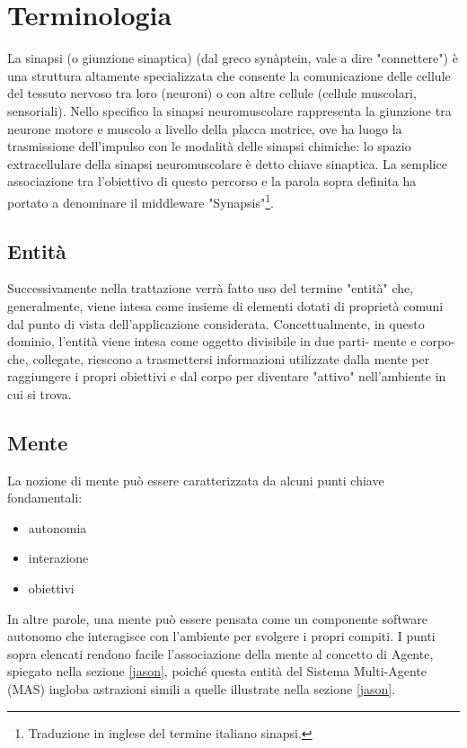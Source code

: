 \section{Terminologia}

La sinapsi (o giunzione sinaptica) (dal greco synàptein, vale a dire "connettere") è una struttura altamente specializzata che consente la comunicazione delle cellule del tessuto nervoso tra loro (neuroni) o con altre cellule (cellule muscolari, sensoriali). Nello specifico la sinapsi neuromuscolare rappresenta la giunzione tra neurone motore e muscolo a livello della placca motrice, ove ha luogo la trasmissione dell'impulso con le modalità delle sinapsi chimiche: lo spazio extracellulare della sinapsi neuromuscolare è detto chiave sinaptica.\cite{treccani}
La semplice associazione tra l'obiettivo di questo percorso e la parola sopra definita ha portato a denominare il middleware "Synapsis"\footnote{Traduzione in inglese del termine italiano sinapsi.}.

\subsection{Entità}

Successivamente nella trattazione verrà fatto uso del termine "entità" che, generalmente, viene intesa come insieme di elementi dotati di proprietà comuni dal punto di vista dell’applicazione considerata.\cite{treccani}
Concettualmente, in questo dominio, l'entità viene intesa come oggetto divisibile in due parti- mente e corpo- che, collegate, riescono a trasmettersi informazioni utilizzate dalla mente per raggiungere i propri obiettivi e dal corpo per diventare "attivo" nell'ambiente in cui si trova.

\subsection{Mente}

La nozione di mente può essere caratterizzata da alcuni punti chiave fondamentali:
\begin{itemize}
   \item autonomia
   \item interazione
   \item obiettivi
\end{itemize}
In altre parole, una mente può essere pensata come un componente software autonomo che interagisce con l'ambiente per svolgere i propri compiti.
I punti sopra elencati rendono facile l'associazione della mente al concetto di Agente, spiegato nella sezione \ref{jason}, poiché questa entità del Sistema Multi-Agente (MAS) ingloba astrazioni simili a quelle illustrate nella sezione \ref{jason}.

